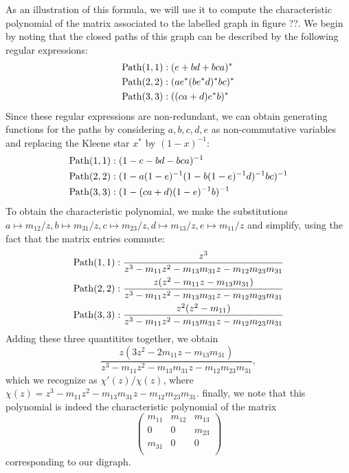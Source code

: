 As an illustration of this formula, we will use it to compute the characteristic
polynomial of the matrix associated to the labelled graph in figure ??.  We begin
by noting that the closed paths of this graph can be described by the following
regular expressions:
\begin{align*}
\mathrm{Path} (1,1) &: (e + bd + bca)^* \\
\mathrm{Path} (2,2) &: (ae^*(be^*d)^*bc)^* \\
\mathrm{Path} (3,3) &: ((ca + d)e^*b)^* \\
\end{align*}
Since these regular expressions are non-redundant, we can obtain generating
functions for the paths by considering $a,b,c,d,e$ as non-commutative
variables and replacing the Kleene star $x^*$ by $(1 - x)^{-1}$:
\begin{align*}
\mathrm{Path} (1,1) &: (1 - e - bd - bca)^{-1} \\
\mathrm{Path} (2,2) &: (1 - a(1-e)^{-1}(1 - b(1-e)^{-1}d)^{-1}bc)^{-1} \\
\mathrm{Path} (3,3) &: (1 - (ca + d)(1 - e)^{-1}b)^{-1} \\
\end{align*}
To obtain the characteristic polynomial, we make the substitutions
$a \mapsto m_{12}/z, b \mapsto m_{31}/z, c \mapsto m_{23}/z, d \mapsto m_{13}/z,
e \mapsto m_{11}/z$ and simplify, using the fact that the matrix entries
commute:
\begin{align*}
\mathrm{Path} (1,1) &: \frac{z^3}
{z^3 - m_{11} z^2 - m_{13} m_{31} z - m_{12} m_{23} m_{31} } \\
\mathrm{Path} (2,2) &: \frac{z(z^2 - m_{11} z - m_{13} m_{31})}
{z^3 - m_{11} z^2 - m_{13} m_{31} z - m_{12} m_{23} m_{31} }  \\
\mathrm{Path} (3,3) &: \frac{z^2(z^2 - m_{11})}
{z^3 - m_{11} z^2 - m_{13} m_{31} z - m_{12} m_{23} m_{31} } \\
\end{align*}
Adding these three quantitites together, we obtain
\[
\frac{z(3 z^2 - 2 m_{11} z - m_{13} m_{31})}
{z^3 - m_{11} z^2 - m_{13} m_{31} z - m_{12} m_{23} m_{31} },
\]
which we recognize as $\chi'(z)/\chi(z)$, where
$\chi(z) = z^3−m_{11} z^2 - m_{13} m_{31} z - m_{12} m_{23} m_{31}$.
finally, we note that this polynomial is indeed the characteristic
polynomial of the matrix
\[
 \begin{pmatrix}
   m_{11} & m_{12} & m_{13} \\
   0      & 0      & m_{23} \\
   m_{31} & 0      & 0 \\
 \end{pmatrix}
\]
corresponding to our digraph.

